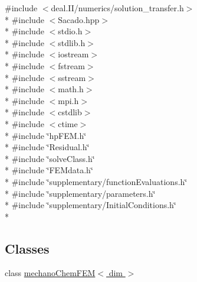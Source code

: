 {\ttfamily \#include $<$deal.\-I\-I/numerics/solution\-\_\-transfer.\-h$>$}\\*
{\ttfamily \#include $<$Sacado.\-hpp$>$}\\*
{\ttfamily \#include $<$stdio.\-h$>$}\\*
{\ttfamily \#include $<$stdlib.\-h$>$}\\*
{\ttfamily \#include $<$iostream$>$}\\*
{\ttfamily \#include $<$fstream$>$}\\*
{\ttfamily \#include $<$sstream$>$}\\*
{\ttfamily \#include $<$math.\-h$>$}\\*
{\ttfamily \#include $<$mpi.\-h$>$}\\*
{\ttfamily \#include $<$cstdlib$>$}\\*
{\ttfamily \#include $<$ctime$>$}\\*
{\ttfamily \#include \char`\"{}hp\-F\-E\-M.\-h\char`\"{}}\\*
{\ttfamily \#include \char`\"{}Residual.\-h\char`\"{}}\\*
{\ttfamily \#include \char`\"{}solve\-Class.\-h\char`\"{}}\\*
{\ttfamily \#include \char`\"{}F\-E\-Mdata.\-h\char`\"{}}\\*
{\ttfamily \#include \char`\"{}supplementary/function\-Evaluations.\-h\char`\"{}}\\*
{\ttfamily \#include \char`\"{}supplementary/parameters.\-h\char`\"{}}\\*
{\ttfamily \#include \char`\"{}supplementary/\-Initial\-Conditions.\-h\char`\"{}}\\*
\subsection*{Classes}
\begin{DoxyCompactItemize}
\item 
class \hyperlink{classmechano_chem_f_e_m}{mechano\-Chem\-F\-E\-M$<$ dim $>$}
\end{DoxyCompactItemize}
